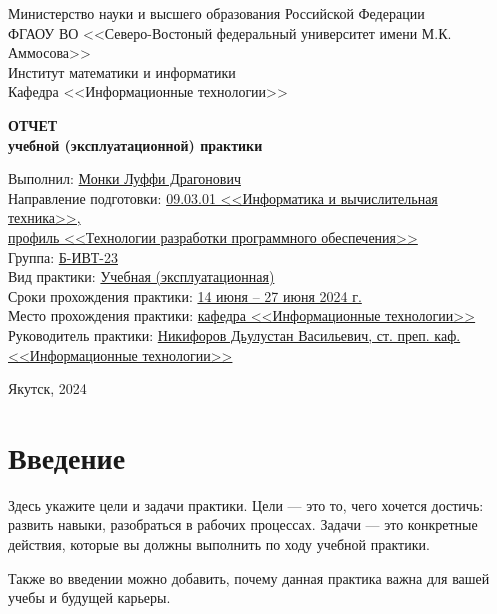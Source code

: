 \documentclass[12pt]{article}
\begin{document}
\thispagestyle{empty}
\begin{center}
  Министерство науки и высшего образования Российской Федерации \\
  ФГАОУ ВО <<Северо-Востоный федеральный университет имени М.К. Аммосова>> \\
  Институт математики и информатики \\
  Кафедра <<Информационные технологии>>
\end{center}

  \vfill
  
\begin{center}
  \Large{
    \textbf{ОТЧЕТ} \\
    \textbf{учебной (эксплуатационной) практики}
  }
\end{center}

\vfill

\begin{flushleft}
Выполнил: \underline{Монки Луффи Драгонович} \\
Направление подготовки: \underline{09.03.01 <<Информатика и вычислительная техника>>,}\\ \underline{профиль <<Технологии разработки программного обеспечения>>} \\
Группа: \underline{Б-ИВТ-23} \\
Вид практики: \underline{Учебная (эксплуатационная)} \\
Сроки прохождения практики: \underline{14 июня -- 27 июня 2024 г.} \\
Место прохождения практики: \underline{кафедра <<Информационные технологии>>} \\
Руководитель практики: \underline{Никифоров Дьулустан Васильевич, \; ст. преп. каф.  <<Информационные технологии>>}
\end{flushleft}

\vfill

\begin{center}
  Якутск, 2024
\end{center}


\newpage \section*{Введение}

Здесь укажите цели и задачи практики. Цели --- это то, чего хочется достичь: развить навыки, разобраться в рабочих процессах. Задачи --- это конкретные действия, которые вы должны выполнить по ходу учебной практики.

Также во введении можно добавить, почему данная практика важна для вашей учебы и будущей карьеры.
\end{document}
